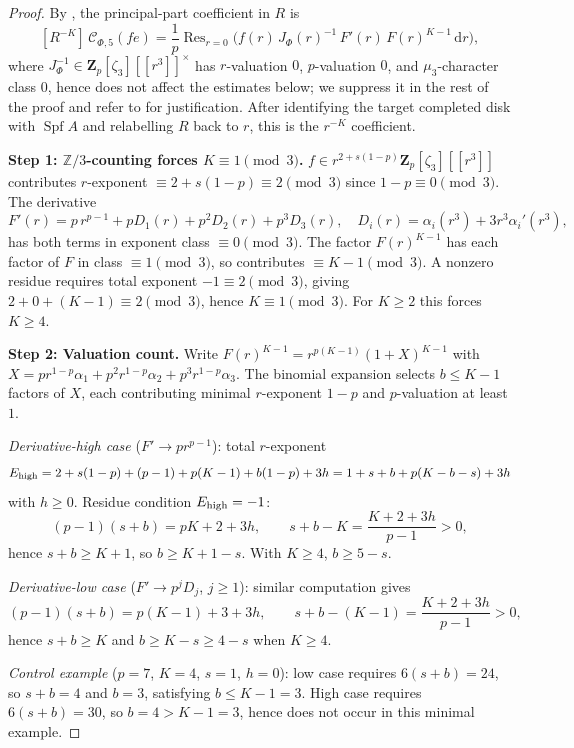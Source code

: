 \documentclass[11pt]{amsart}
\theoremstyle{definition}
\theoremstyle{remark}
\newcommand{\Z}{\mathbf{Z}}
\newcommand{\dd}{\mathrm{d}}
\newcommand{\Res}{\operatorname{Res}}
\begin{document}
\begin{proof}
By , the principal-part coefficient in $R$ is
\begin{equation}\label{eq:residue-formula}
[R^{-K}]\,\mathcal C_{\Phi,5}(fe)=\frac{1}{p}\Res_{r=0}\!\bigl(f(r)\,J_\Phi(r)^{-1}\,F'(r)\,F(r)^{K-1}\,\dd r\bigr),
\end{equation}
where $J_\Phi^{-1}\in\Z_p[\zeta_3][[r^3]]^\times$ has $r$-valuation $0$, $p$-valuation $0$, and $\mu_3$-character class $0$, hence does not affect the estimates below; we suppress it in the rest of the proof and refer to  for justification. After identifying the target completed disk with $\operatorname{Spf}A$ and relabelling $R$ back to $r$, this is the $r^{-K}$ coefficient.

\medskip\noindent\textbf{Step 1: $\mathbb Z/3$-counting forces $K\equiv 1\pmod 3$.}\quad
$f\in r^{2+s(1-p)}\Z_p[\zeta_3][[r^3]]$ contributes $r$-exponent $\equiv 2+s(1-p)\equiv 2\pmod 3$ since $1-p\equiv 0\pmod 3$. The derivative
\[
F'(r)=p\,r^{p-1}+pD_1(r)+p^2D_2(r)+p^3D_3(r),\quad D_i(r)=\alpha_i(r^3)+3r^3\alpha_i'(r^3),
\]
has both terms in exponent class $\equiv 0\pmod 3$. The factor $F(r)^{K-1}$ has each factor of $F$ in class $\equiv 1\pmod 3$, so contributes $\equiv K-1\pmod 3$. A nonzero residue requires total exponent $-1\equiv 2\pmod 3$, giving $2+0+(K-1)\equiv 2\pmod 3$, hence $K\equiv 1\pmod 3$. For $K\ge 2$ this forces $K\ge 4$.

\medskip\noindent\textbf{Step 2: Valuation count.}\quad
Write $F(r)^{K-1}=r^{p(K-1)}(1+X)^{K-1}$ with $X=pr^{1-p}\alpha_1+p^2r^{1-p}\alpha_2+p^3r^{1-p}\alpha_3$. The binomial expansion selects $b\le K-1$ factors of $X$, each contributing minimal $r$-exponent $1-p$ and $p$-valuation at least $1$.

\emph{Derivative-high case} ($F'\to pr^{p-1}$): total $r$-exponent
\[
E_{\rm high}=2+s(1-p)+(p-1)+p(K-1)+b(1-p)+3h=1+s+b+p(K-b-s)+3h
\]
with $h\ge 0$. Residue condition $E_{\rm high}=-1$:
\[
(p-1)(s+b)=pK+2+3h,\qquad s+b-K=\frac{K+2+3h}{p-1}>0,
\]
hence $s+b\ge K+1$, so $b\ge K+1-s$. With $K\ge 4$, $b\ge 5-s$.

\emph{Derivative-low case} ($F'\to p^jD_j$, $j\ge 1$): similar computation gives
\[
(p-1)(s+b)=p(K-1)+3+3h,\qquad s+b-(K-1)=\frac{K+2+3h}{p-1}>0,
\]
hence $s+b\ge K$ and $b\ge K-s\ge 4-s$ when $K\ge 4$.

\emph{Control example} ($p=7$, $K=4$, $s=1$, $h=0$): low case requires $6(s+b)=24$, so $s+b=4$ and $b=3$, satisfying $b\le K-1=3$. High case requires $6(s+b)=30$, so $b=4>K-1=3$, hence does not occur in this minimal example.


\end{proof}
\end{document}
